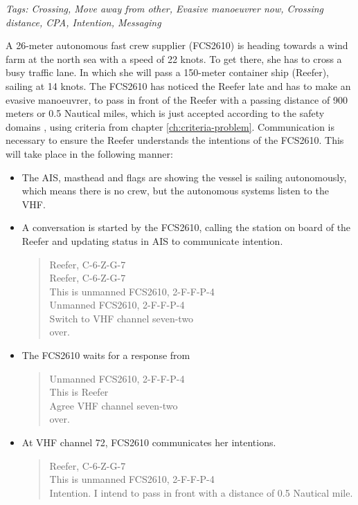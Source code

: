 \emph{Tags: Crossing, Move away from other, Evasive manoeuvrer now, Crossing distance, \ac{CPA}, Intention, Messaging}

A 26-meter autonomous fast crew supplier (FCS2610) is heading towards a wind farm at the north sea with a speed of 22 knots. To get there, she has to cross a busy traffic lane. In which she will pass a 150-meter container ship (Reefer), sailing at 14 knots. The FCS2610 has noticed the Reefer late and has to make an evasive manoeuvrer, to pass in front of the Reefer with a passing distance of 900 meters or 0.5 Nautical miles, which is just accepted according to the safety domains \cite{Szlapczynski2017a}, using criteria from chapter \ref{ch:criteria-problem}.
Communication is necessary to ensure the Reefer understands the intentions of the FCS2610. This will take place in the following manner:
\begin{itemize}
	\item The \ac{AIS}, masthead and flags are showing the vessel is sailing autonomously, which means there is no crew, but the autonomous systems listen to the \ac{VHF}.
	\item A conversation is started by the FCS2610, calling the station on board of the Reefer and updating status in \ac{AIS} to communicate intention. 
	\begin{quote}
		Reefer, C-6-Z-G-7\\
		Reefer, C-6-Z-G-7\\
		This is unmanned FCS2610, 2-F-F-P-4 \\
		Unmanned FCS2610, 2-F-F-P-4 \\
		Switch to VHF channel seven-two\\
		over.
	\end{quote}
	\item The FCS2610 waits for a response from 
	\begin{quote}
		Unmanned FCS2610, 2-F-F-P-4 \\
		This is Reefer\\
		Agree VHF channel seven-two\\
		over.
	\end{quote}
	\item At \ac{VHF} channel 72, FCS2610 communicates her intentions.
	\begin{quote}
		Reefer, C-6-Z-G-7\\
		This is unmanned FCS2610, 2-F-F-P-4 \\
		Intention. I intend to pass in front with a distance of 0.5 Nautical mile.\\

\end{quote}
\end{itemize}
